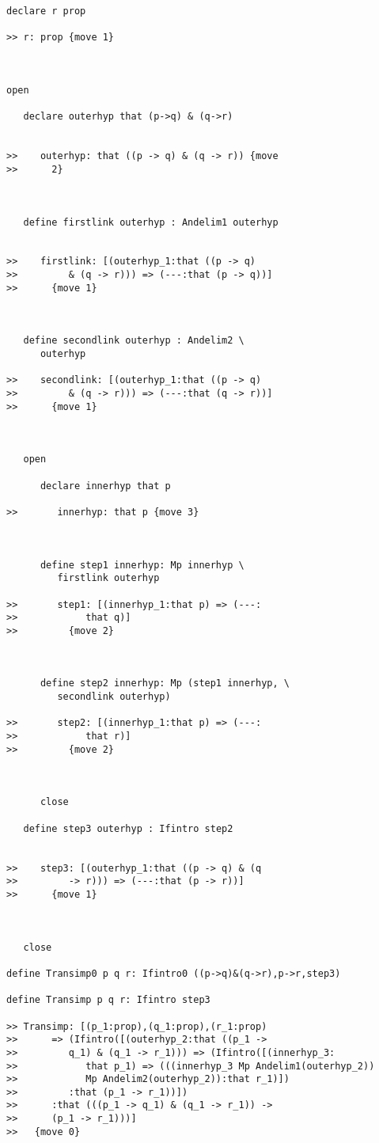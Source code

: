 \documentclass[12pt]{article}
\begin{document}
\begin{verbatim}
declare r prop

>> r: prop {move 1}



open

   declare outerhyp that (p->q) & (q->r)


>>    outerhyp: that ((p -> q) & (q -> r)) {move
>>      2}



   define firstlink outerhyp : Andelim1 outerhyp


>>    firstlink: [(outerhyp_1:that ((p -> q)
>>         & (q -> r))) => (---:that (p -> q))]
>>      {move 1}



   define secondlink outerhyp : Andelim2 \
      outerhyp

>>    secondlink: [(outerhyp_1:that ((p -> q)
>>         & (q -> r))) => (---:that (q -> r))]
>>      {move 1}



   open

      declare innerhyp that p

>>       innerhyp: that p {move 3}



      define step1 innerhyp: Mp innerhyp \
         firstlink outerhyp

>>       step1: [(innerhyp_1:that p) => (---:
>>            that q)]
>>         {move 2}



      define step2 innerhyp: Mp (step1 innerhyp, \
         secondlink outerhyp)

>>       step2: [(innerhyp_1:that p) => (---:
>>            that r)]
>>         {move 2}



      close

   define step3 outerhyp : Ifintro step2


>>    step3: [(outerhyp_1:that ((p -> q) & (q
>>         -> r))) => (---:that (p -> r))]
>>      {move 1}



   close
   
define Transimp0 p q r: Ifintro0 ((p->q)&(q->r),p->r,step3)

define Transimp p q r: Ifintro step3

>> Transimp: [(p_1:prop),(q_1:prop),(r_1:prop)
>>      => (Ifintro([(outerhyp_2:that ((p_1 ->
>>         q_1) & (q_1 -> r_1))) => (Ifintro([(innerhyp_3:
>>            that p_1) => (((innerhyp_3 Mp Andelim1(outerhyp_2))
>>            Mp Andelim2(outerhyp_2)):that r_1)])
>>         :that (p_1 -> r_1))])
>>      :that (((p_1 -> q_1) & (q_1 -> r_1)) ->
>>      (p_1 -> r_1)))]
>>   {move 0}




\end{verbatim}
\end{document}
